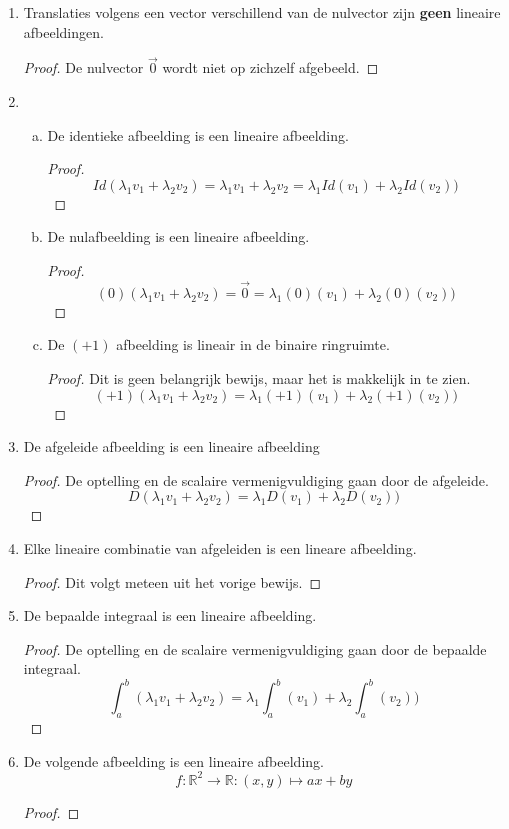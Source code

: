\documentclass[lineaire_algebra_oplossingen.tex]{subfiles}
\begin{document}
\begin{enumerate}
\item Translaties volgens een vector verschillend van de nulvector zijn \textbf{geen} lineaire afbeeldingen.
\begin{proof}
De nulvector $\vec{0}$ wordt niet op zichzelf afgebeeld.
\end{proof}
\item
\begin{enumerate}[a)]
\item De identieke afbeelding is een lineaire afbeelding.
\begin{proof}
\[
Id(\lambda_1v_1+\lambda_2v_2) = \lambda_1v_1+\lambda_2v_2 = \lambda_1Id(v_1)+\lambda_2Id(v_2))
\]
\end{proof}
\item De nulafbeelding is een lineaire afbeelding.
\begin{proof}
\[
(0)(\lambda_1v_1+\lambda_2v_2) = \vec{0} = \lambda_1(0)(v_1)+\lambda_2(0)(v_2))
\]
\end{proof}
\item De $(+1)$ afbeelding is lineair in de binaire ringruimte.
\begin{proof}
Dit is geen belangrijk bewijs, maar het is makkelijk in te zien.
\[
(+1)(\lambda_1v_1+\lambda_2v_2) = \lambda_1(+1)(v_1)+\lambda_2(+1)(v_2))
\]
\end{proof}
\end{enumerate}
\item De afgeleide afbeelding is een lineaire afbeelding
\begin{proof}
De optelling en de scalaire vermenigvuldiging gaan door de afgeleide.
\[
D(\lambda_1v_1+\lambda_2v_2) = \lambda_1D(v_1)+\lambda_2D(v_2))
\]
\end{proof}
\item Elke lineaire combinatie van afgeleiden is een lineare afbeelding.
\begin{proof}
Dit volgt meteen uit het vorige bewijs.
\end{proof}
\item De bepaalde integraal is een lineaire afbeelding.
\begin{proof}
De optelling en de scalaire vermenigvuldiging gaan door de bepaalde integraal.
\[
\int_a^b(\lambda_1v_1+\lambda_2v_2) = \lambda_1\int_a^b(v_1)+\lambda_2\int_a^b(v_2))
\]
\end{proof}
\item De volgende afbeelding is een lineaire afbeelding.
\[f: \mathbb{R}^2 \rightarrow \mathbb{R}: (x,y) \mapsto ax+by\]
\begin{proof}

\end{proof}
\end{enumerate}
\end{document}
